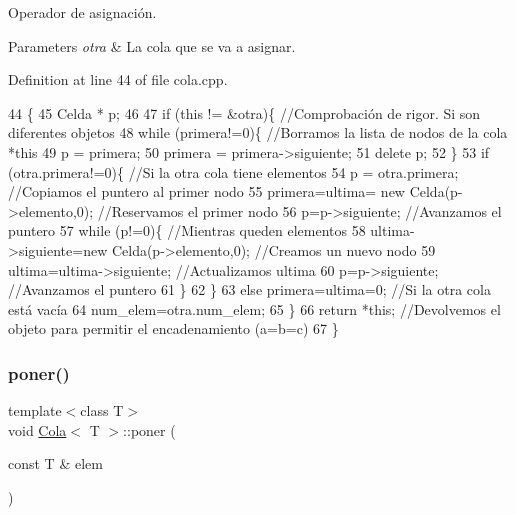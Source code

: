 Operador de asignación. 


\begin{DoxyParams}{Parameters}
{\em otra} & La cola que se va a asignar. \\
\hline
\end{DoxyParams}


Definition at line 44 of file cola.\+cpp.


\begin{DoxyCode}
44                                                \{
45   Celda * p;
46 
47   \textcolor{keywordflow}{if} (\textcolor{keyword}{this} != &otra)\{    \textcolor{comment}{//Comprobación de rigor. Si son diferentes objetos}
48     \textcolor{keywordflow}{while} (primera!=0)\{  \textcolor{comment}{//Borramos la lista de nodos de la cola *this}
49       p = primera;
50       primera = primera->siguiente;
51       \textcolor{keyword}{delete} p;
52     \}
53     \textcolor{keywordflow}{if} (otra.primera!=0)\{        \textcolor{comment}{//Si la otra cola tiene elementos}
54       p = otra.primera;          \textcolor{comment}{//Copiamos el puntero al primer nodo}
55       primera=ultima= \textcolor{keyword}{new} Celda(p->elemento,0); \textcolor{comment}{//Reservamos el primer nodo}
56       p=p->siguiente;                           \textcolor{comment}{//Avanzamos el puntero}
57       \textcolor{keywordflow}{while} (p!=0)\{                             \textcolor{comment}{//Mientras queden elementos}
58         ultima->siguiente=\textcolor{keyword}{new} Celda(p->elemento,0); \textcolor{comment}{//Creamos un nuevo nodo}
59         ultima=ultima->siguiente;                   \textcolor{comment}{//Actualizamos ultima}
60         p=p->siguiente;                             \textcolor{comment}{//Avanzamos el puntero}
61       \}
62     \}
63     \textcolor{keywordflow}{else} primera=ultima=0;      \textcolor{comment}{//Si la otra cola está vacía}
64     num\_elem=otra.num\_elem;
65   \}
66   \textcolor{keywordflow}{return} *\textcolor{keyword}{this}; \textcolor{comment}{//Devolvemos el objeto para permitir el encadenamiento (a=b=c)}
67 \}
\end{DoxyCode}
\mbox{\label{classCola_a4a902e5805ae74f8d80c6f3267fd14c4}} 
\subsubsection{\texorpdfstring{poner()}{poner()}}
{\footnotesize\ttfamily template$<$class T$>$ \\
void \hyperlink{classCola}{Cola}$<$ T $>$\+::poner (\begin{DoxyParamCaption}\item[{const T \&}]{elem }\end{DoxyParamCaption})}



